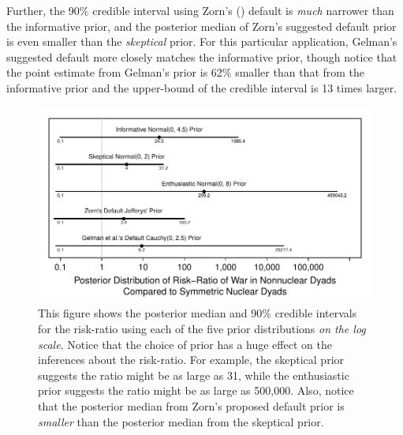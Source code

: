 \documentclass[12pt]{article}
\begin{document}
Further, the 90\% credible interval using Zorn's (\citeyear{Zorn2005}) default is \emph{much} narrower than the informative prior, and the posterior median of Zorn's suggested default prior is even smaller than the \emph{skeptical} prior. 
For this particular application, Gelman's suggested default more closely matches the informative prior, though notice that the point estimate from Gelman's prior is 62\% smaller than that from the informative prior and the upper-bound of the credible interval is 13 times larger.

\begin{figure}[H]
\begin{center}
\includegraphics[scale = .8]{figs/bm-rr.pdf}
\caption{This figure shows the posterior median and 90\% credible intervals for the risk-ratio using each of the five prior distributions \emph{on the log scale}. 
Notice that the choice of prior has a huge effect on the inferences about the risk-ratio. 
For example, the skeptical prior suggests the ratio might be as large as 31, while the enthusiastic prior suggests the ratio might be as large as 500,000. 
Also, notice that the posterior median from Zorn's proposed default prior is \emph{smaller} than the posterior median from the skeptical prior.}\label{fig:bm-rr}
\end{center}
\end{figure}
\end{document}
